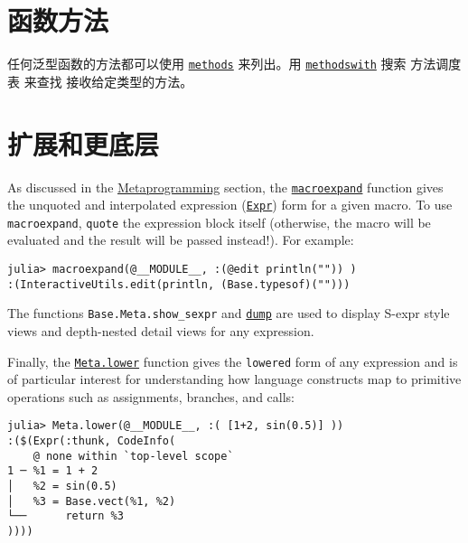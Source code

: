 \hypertarget{15829703883389410283}{}


\section{函数方法}



任何泛型函数的方法都可以使用 \hyperlink{3025953302266245919}{\texttt{methods}} 来列出。用 \hyperlink{1845157398882896709}{\texttt{methodswith}} 搜索 方法调度表 来查找 接收给定类型的方法。



\hypertarget{12369440035598215363}{}


\section{扩展和更底层}



As discussed in the \hyperlink{15430858583934124136}{Metaprogramming} section, the \hyperlink{8018172489611994488}{\texttt{macroexpand}} function gives the unquoted and interpolated expression (\hyperlink{17120496304147995299}{\texttt{Expr}}) form for a given macro. To use \texttt{macroexpand}, \texttt{quote} the expression block itself (otherwise, the macro will be evaluated and the result will be passed instead!). For example:




\begin{verbatim}
julia> macroexpand(@__MODULE__, :(@edit println("")) )
:(InteractiveUtils.edit(println, (Base.typesof)("")))
\end{verbatim}



The functions \texttt{Base.Meta.show\_sexpr} and \hyperlink{15981569052160951906}{\texttt{dump}} are used to display S-expr style views and depth-nested detail views for any expression.



Finally, the \hyperlink{6644553029841096787}{\texttt{Meta.lower}} function gives the \texttt{lowered} form of any expression and is of particular interest for understanding how language constructs map to primitive operations such as assignments, branches, and calls:




\begin{verbatim}
julia> Meta.lower(@__MODULE__, :( [1+2, sin(0.5)] ))
:($(Expr(:thunk, CodeInfo(
    @ none within `top-level scope`
1 ─ %1 = 1 + 2
│   %2 = sin(0.5)
│   %3 = Base.vect(%1, %2)
└──      return %3
))))
\end{verbatim}



